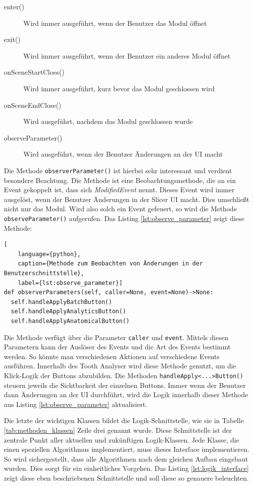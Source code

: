 \begin{description}
	\item[enter()] Wird immer ausgeführt, wenn der Benutzer das Modul öffnet

	\item[exit()] Wird immer ausgeführt, wenn der Benutzer ein anderes Modul
		öffnet

	\item[onSceneStartCloes()] Wird immer ausgeführt, kurz bevor das Modul
		geschlossen wird

	\item[onSceneEndClose()] Wird ausgeführt, nachdem das Modul geschlossen wurde

	\item[observeParameter()] Wird ausgeführt, wenn der Benutzer Änderungen an der
		\ac{UI} macht
\end{description}

Die Methode \texttt{observerParameter()} ist hierbei sehr interessant und verdient
besondere Beachtung. Die Methode ist eine Beobachtungsmethode, die an ein Event gekoppelt
ist, dass sich \textit{ModifiedEvent} nennt. Dieses Event wird immer ausgelöst, wenn
der Benutzer Änderungen in der Slicer \ac{UI} macht. Dies umschließt nicht nur das
Modul. Wird also solch ein Event gefeuert, so wird die Methode \texttt{observeParameter()}
aufgerufen. Das Listing \ref{lst:observe_parameter} zeigt diese Methode:

\begin{lstlisting}[
    language={python},
    caption={Methode zum Beobachten von Änderungen in der Benutzerschnittstelle},
    label={lst:observe_parameter}]
def observerParameters(self, caller=None, event=None)->None:
  self.handleApplyBatchButton()
  self.handleApplyAnalyticsButton()
  self.handleApplyAnatomicalButton()
\end{lstlisting}

Die Methode verfügt über die Parameter \texttt{caller} und \texttt{event}. Mittels
diesen Parametern kann der Auslöser des Events und die Art des Events bestimmt werden.
So könnte man verschiedenen Aktionen auf verschiedene Events ausführen. Innerhalb
des Tooth Analyser wird diese Methode genutzt, um die Klick-Logik der Buttons
abzubilden. Die Methoden \texttt{handleApply<...>Button()} steuern jeweils die
Sichtbarkeit der einzelnen Buttons. Immer wenn der Benutzer dann Änderungen an der
UI durchführt, wird die Logik innerhalb dieser Methode aus Listing
\ref{lst:observe_parameter} aktualisiert.

Die letzte der wichtigen Klassen bildet die Logik-Schnittstelle, wie sie in Tabelle
\ref{tab:methoden_klassen} Zeile drei genannt wurde. Diese Schnittstelle ist der
zentrale Punkt aller aktuellen und zukünftigen Logik-Klassen. Jede Klasse, die
einen speziellen Algorithmus implementiert, muss dieses Interface implementieren.
So wird sichergestellt, dass alle Algorithmen nach dem gleichen Aufbau eingebaut
wurden. Dies sorgt für ein einheitliches Vorgehen. Das Listing \ref{lst:logik_interface}
zeigt diese eben beschriebenen Schnittstelle und soll diese so genauere beleuchten.

